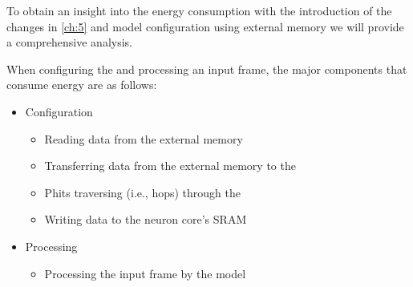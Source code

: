 To obtain an insight into the energy consumption with the introduction of the \confignoc{} changes in \cref{ch:5} and model configuration using external memory we will provide a comprehensive analysis.

When configuring the \graicore{} and processing an input frame, the major components that consume energy are as follows:
\begin{itemize}
    \item Configuration
    \begin{itemize}
        \item Reading data from the external memory
        \item Transferring data from the external memory to the \confignoc{}
        \item Phits traversing (i.e., hops) through the \confignoc{}
        \item Writing data to the neuron core's SRAM
    \end{itemize}
    \item Processing
    \begin{itemize}
        \item Processing the input frame by the model
    \end{itemize}
\end{itemize}

